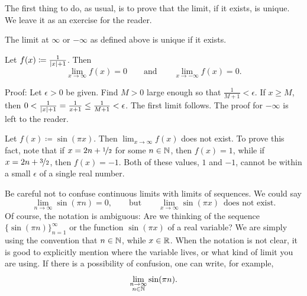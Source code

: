 The first thing to do, as usual, is to prove that the limit, if it exists,
is unique.
We leave it as an exercise for the reader.

\begin{prop} \label{liminfty:unique}
The limit at $\infty$ or $-\infty$ as defined above is unique if it exists.
\end{prop}

\begin{example}
Let $f(x) \coloneqq \frac{1}{\lvert {x} \rvert+1}$.  Then
\begin{equation*}
\lim_{x\to \infty} f(x) = 0 \qquad \text{and} \qquad
\lim_{x\to -\infty} f(x) = 0 .
\end{equation*}

Proof:
Let $\epsilon > 0$ be given.  Find $M > 0$ large enough
so that $\frac{1}{M+1} < \epsilon$.  If
$x \geq M$, then $0 < \frac{1}{\lvert {x} \rvert+1} = \frac{1}{x+1} \leq \frac{1}{M+1} < \epsilon$.
The first limit follows.
The proof for $-\infty$ is left to the reader.
\end{example}

\begin{example}
Let $f(x) \coloneqq \sin(\pi x)$.  Then $\lim_{x\to\infty} f(x)$ does not exist.
To prove this fact, note that if $x = 2n+\nicefrac{1}{2}$ for some $n \in
{\mathbb{N}}$, then $f(x)=1$,
while if $x = 2n+\nicefrac{3}{2}$, then $f(x)=-1$.
Both of these values, $1$ and $-1$, cannot be
within a small $\epsilon$ of a single real number.

Be careful not to confuse continuous limits with limits of sequences.
We could say
\begin{equation*}
\lim_{n \to \infty} \sin(\pi n) = 0, \qquad \text{but} \qquad
\lim_{x \to \infty} \sin(\pi x) \enspace \text{does not exist}.
\end{equation*}
Of course, the notation is ambiguous:  Are we thinking of the
sequence $\bigl\{ \sin (\pi n) \bigr\}_{n=1}^\infty$ or the function $\sin(\pi x)$
of a real variable?  We are simply using the convention
that $n \in {\mathbb{N}}$, while $x \in {\mathbb{R}}$.  When the notation is not clear,
it is good to explicitly mention where the variable lives, or what kind
of limit you are using.  If there is a possibility of confusion, one can
write, for example,
\begin{equation*}
\lim_{\substack{n \to \infty\\n \in {\mathbb{N}}}} \sin(\pi n) .
\end{equation*}
\end{example}

